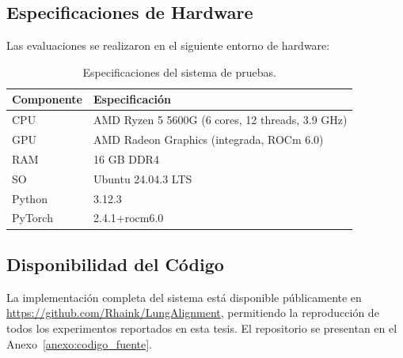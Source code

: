 \subsection{Especificaciones de Hardware}
\label{subsec:hardware_specs}

Las evaluaciones se realizaron en el siguiente entorno de hardware:

\begin{table}[htbp]
    \centering
    \caption{Especificaciones del sistema de pruebas.}
    \label{tab:hardware_specs}
    \small
    \begin{tabular}{@{}ll@{}}
        \toprule
        \textbf{Componente} & \textbf{Especificación} \\
        \midrule
        CPU & AMD Ryzen 5 5600G (6 cores, 12 threads, 3.9 GHz) \\
        GPU & AMD Radeon Graphics (integrada, ROCm 6.0) \\
        RAM & 16 GB DDR4 \\
        SO & Ubuntu 24.04.3 LTS \\
        Python & 3.12.3 \\
        PyTorch & 2.4.1+rocm6.0 \\
        \bottomrule
    \end{tabular}
\end{table}

\subsection{Disponibilidad del Código}
\label{subsec:disponibilidad_codigo}

La implementación completa del sistema está disponible públicamente en \url{https://github.com/Rhaink/LungAlignment}, permitiendo la reproducción de todos los experimentos reportados en esta tesis. El repositorio se presentan en el Anexo~\ref{anexo:codigo_fuente}.
